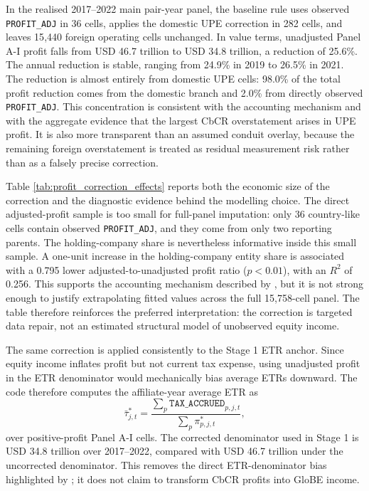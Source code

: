 \documentclass[11pt,a4paper]{article}
\newcommand{\code}[1]{\texttt{#1}}
\begin{document}
In the realised 2017--2022 main pair-year panel, the baseline rule uses observed \code{PROFIT\_ADJ} in 36 cells, applies the domestic UPE correction in 282 cells, and leaves 15{,}440 foreign operating cells unchanged. In value terms, unadjusted Panel A-I profit falls from USD 46.7 trillion to USD 34.8 trillion, a reduction of 25.6\%. The annual reduction is stable, ranging from 24.9\% in 2019 to 26.5\% in 2021. The reduction is almost entirely from domestic UPE cells: 98.0\% of the total profit reduction comes from the domestic branch and 2.0\% from directly observed \code{PROFIT\_ADJ}. This concentration is consistent with the accounting mechanism and with the aggregate evidence that the largest CbCR overstatement arises in UPE profit. It is also more transparent than an assumed conduit overlay, because the remaining foreign overstatement is treated as residual measurement risk rather than as a falsely precise correction.



Table \ref{tab:profit_correction_effects} reports both the economic size of the correction and the diagnostic evidence behind the modelling choice. The direct adjusted-profit sample is too small for full-panel imputation: only 36 country-like cells contain observed \code{PROFIT\_ADJ}, and they come from only two reporting parents. The holding-company share is nevertheless informative inside this small sample. A one-unit increase in the holding-company entity share is associated with a 0.795 lower adjusted-to-unadjusted profit ratio ($p<0.01$), with an $R^2$ of 0.256. This supports the accounting mechanism described by \citet{blouin2023}, but it is not strong enough to justify extrapolating fitted values across the full 15{,}758-cell panel. The table therefore reinforces the preferred interpretation: the correction is targeted data repair, not an estimated structural model of unobserved equity income.

The same correction is applied consistently to the Stage 1 ETR anchor. Since equity income inflates profit but not current tax expense, using unadjusted profit in the ETR denominator would mechanically bias average ETRs downward. The code therefore computes the affiliate-year average ETR as
\begin{equation}\label{eq:corrected_etr_anchor}
\bar{\tau}^{*}_{j,t}
=
\frac{\sum_p \code{TAX\_ACCRUED}_{p,j,t}}
{\sum_p \pi^{*}_{p,j,t}},
\end{equation}
over positive-profit Panel A-I cells. The corrected denominator used in Stage 1 is USD 34.8 trillion over 2017--2022, compared with USD 46.7 trillion under the uncorrected denominator. This removes the direct ETR-denominator bias highlighted by \citet{blouin2023}; it does not claim to transform CbCR profits into GloBE income.
\end{document}
